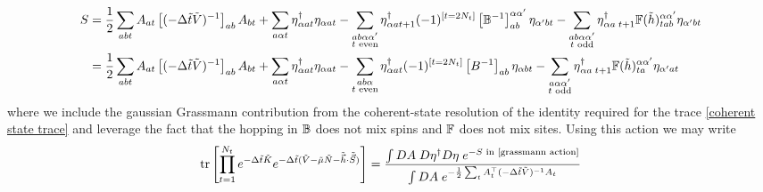\begin{align}
	S &= 
	\frac{1}{2} \sum_{ab t} A_{at} \left[(-\Delta\tilde{t} \tilde{V})^{-1}\right]_{ab} A_{bt}
+	\sum_{a \alpha t} \eta{}^{\dagger}_{\alpha a t} \eta_{\alpha a t}
-	\sum_{\substack{ab \alpha\alpha' \\ t\text{ even}}} \eta{}^{\dagger}_{\alpha a t+1} (-1)^{[t=2N_t]}\left[\mathbb{B}^{-1}\right]^{\alpha\alpha'}_{ab} \eta_{\alpha' b t}
-	\sum_{\substack{ab \alpha\alpha' \\ t\text{ odd}}}\eta{}^{\dagger}_{\alpha a\; t+1} \mathbb{F}(\tilde{h})^{\alpha\alpha'}_{tab} \eta_{\alpha' b t}
\nonumber\\
	&=
	\frac{1}{2} \sum_{ab t} A_{at} \left[(-\Delta\tilde{t} \tilde{V})^{-1}\right]_{ab} A_{bt}
+	\sum_{a \alpha t} \eta{}^{\dagger}_{\alpha a t} \eta_{\alpha a t}
-	\sum_{\substack{ab \alpha \\ t\text{ even}}} \eta{}^{\dagger}_{\alpha a t} (-1)^{[t=2N_t]}\left[B^{-1}\right]_{ab} \eta_{\alpha b t}
-	\sum_{\substack{a \alpha\alpha' \\ t\text{ odd}}}\eta{}^{\dagger}_{\alpha a\; t+1} \mathbb{F}(\tilde{h})^{\alpha\alpha'}_{ta} \eta_{\alpha' a t}
	\label{eq:grassmann action}
\end{align}
where we include the gaussian Grassmann contribution from the coherent-state resolution of the identity required for the trace \eqref{coherent state trace} and leverage the fact that the hopping in $\mathbb{B}$ does not mix spins and $\mathbb{F}$ does not mix sites.
Using this action we may write
\begin{align}
	\tr{\prod_{t=1}^{N_t} e^{-\Delta \tilde{t}\tilde{K}}  e^{-\Delta \tilde{t}(\tilde{V} - \tilde{\mu}\tilde{N} - \tilde{\vec{h}}\cdot\tilde{\vec{S}})} }
	= 
	\frac{  
		\int DA\; D\eta\adjoint D\eta\; e^{-S\text{ in \eqref{grassmann action}}}
	}{ 
		\int DA\; e^{-\frac{1}{2} \sum_t A\transpose_t (-\Delta\tilde{t} \tilde{V})\inverse A_t}
	}
\end{align}

